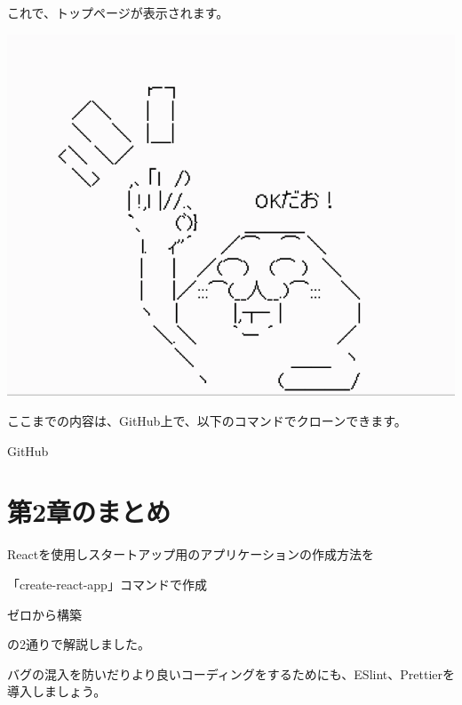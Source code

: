 これで、トップページが表示されます。

\begin{reviewimage}%
\includegraphics[width=0.5\maxwidth]{./images/02-create-react-app/ok3.png}%
\label{image:02-create-react-app:ok3}
\end{reviewimage}
\begin{starternote}[]{}

ここまでの内容は、GitHub上で、以下のコマンドでクローンできます。

\def\startercodeblockfontsize{}
\begin{starterterminal}[]{GitHub}\end{starterterminal}
\end{starternote}

\section{第2章のまとめ}
\keeplastskip{
  \label{sec:2-5}
  \label{sec-chap02review}
  \par\nobreak
}

Reactを使用しスタートアップ用のアプリケーションの作成方法を

\begin{starteritemize}
\item 「create{-}react{-}app」コマンドで作成
\item ゼロから構築
\end{starteritemize}

の2通りで解説しました。

\vspace*{\baselineskip}

バグの混入を防いだりより良いコーディングをするためにも、ESlint、Prettierを導入しましょう。
